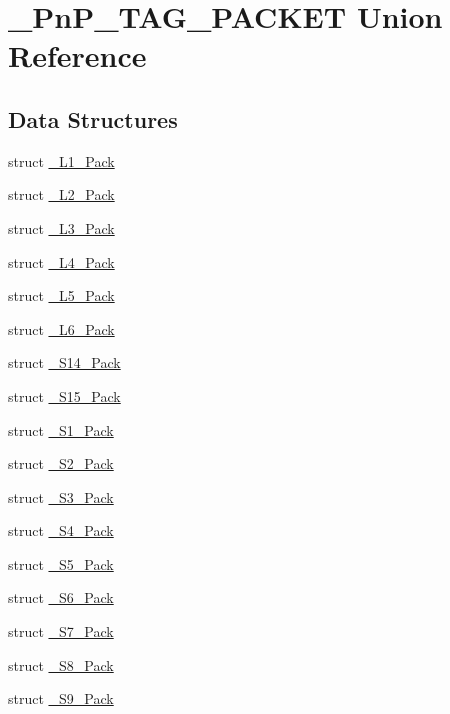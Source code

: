 \hypertarget{union__PnP__TAG__PACKET}{}\section{\+\_\+\+Pn\+P\+\_\+\+T\+A\+G\+\_\+\+P\+A\+C\+K\+ET Union Reference}
\label{union__PnP__TAG__PACKET}
\subsection*{Data Structures}
\begin{DoxyCompactItemize}
\item 
struct \mbox{\hyperlink{struct__PnP__TAG__PACKET_1_1__L1__Pack}{\+\_\+\+L1\+\_\+\+Pack}}
\item 
struct \mbox{\hyperlink{struct__PnP__TAG__PACKET_1_1__L2__Pack}{\+\_\+\+L2\+\_\+\+Pack}}
\item 
struct \mbox{\hyperlink{struct__PnP__TAG__PACKET_1_1__L3__Pack}{\+\_\+\+L3\+\_\+\+Pack}}
\item 
struct \mbox{\hyperlink{struct__PnP__TAG__PACKET_1_1__L4__Pack}{\+\_\+\+L4\+\_\+\+Pack}}
\item 
struct \mbox{\hyperlink{struct__PnP__TAG__PACKET_1_1__L5__Pack}{\+\_\+\+L5\+\_\+\+Pack}}
\item 
struct \mbox{\hyperlink{struct__PnP__TAG__PACKET_1_1__L6__Pack}{\+\_\+\+L6\+\_\+\+Pack}}
\item 
struct \mbox{\hyperlink{struct__PnP__TAG__PACKET_1_1__S14__Pack}{\+\_\+\+S14\+\_\+\+Pack}}
\item 
struct \mbox{\hyperlink{struct__PnP__TAG__PACKET_1_1__S15__Pack}{\+\_\+\+S15\+\_\+\+Pack}}
\item 
struct \mbox{\hyperlink{struct__PnP__TAG__PACKET_1_1__S1__Pack}{\+\_\+\+S1\+\_\+\+Pack}}
\item 
struct \mbox{\hyperlink{struct__PnP__TAG__PACKET_1_1__S2__Pack}{\+\_\+\+S2\+\_\+\+Pack}}
\item 
struct \mbox{\hyperlink{struct__PnP__TAG__PACKET_1_1__S3__Pack}{\+\_\+\+S3\+\_\+\+Pack}}
\item 
struct \mbox{\hyperlink{struct__PnP__TAG__PACKET_1_1__S4__Pack}{\+\_\+\+S4\+\_\+\+Pack}}
\item 
struct \mbox{\hyperlink{struct__PnP__TAG__PACKET_1_1__S5__Pack}{\+\_\+\+S5\+\_\+\+Pack}}
\item 
struct \mbox{\hyperlink{struct__PnP__TAG__PACKET_1_1__S6__Pack}{\+\_\+\+S6\+\_\+\+Pack}}
\item 
struct \mbox{\hyperlink{struct__PnP__TAG__PACKET_1_1__S7__Pack}{\+\_\+\+S7\+\_\+\+Pack}}
\item 
struct \mbox{\hyperlink{struct__PnP__TAG__PACKET_1_1__S8__Pack}{\+\_\+\+S8\+\_\+\+Pack}}
\item 
struct \mbox{\hyperlink{struct__PnP__TAG__PACKET_1_1__S9__Pack}{\+\_\+\+S9\+\_\+\+Pack}}
\end{DoxyCompactItemize}
